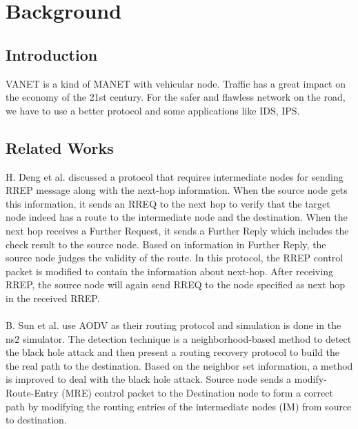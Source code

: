 
\chapter{Background} %

\label{Chapter2} %


\section{Introduction}
VANET is a kind of MANET with vehicular node.
Traffic has a great impact on the economy of the 21st century. For the safer and flawless network on the road, we have to use a better protocol and some applications like IDS, IPS.

\section{Related Works}
H. Deng et al.\cite{qa:1} discussed a protocol that requires intermediate nodes for sending RREP message along with the next-hop information. When the source node gets this information,
it sends an RREQ to the next hop to verify that the target node indeed has a route to the intermediate node and the destination. When
the next hop receives a Further Request, it sends a Further
Reply which includes the check result to the source node.
Based on information in Further Reply, the source node judges
the validity of the route. In this protocol, the RREP control
packet is modified to contain the information about next-hop.
After receiving RREP, the source node will again send RREQ
to the node specified as next hop in the received RREP.\\\\

B. Sun et al. \cite{qa:2} use AODV as their routing protocol and
simulation is done in the ns2 simulator. The detection technique
is a neighborhood-based method to detect the black hole
attack and then present a routing recovery protocol to build the
the real path to the destination. Based on the neighbor set
information, a method is improved to deal with the black hole
attack. Source node
sends a modify-Route-Entry (MRE) control packet to the
Destination node to form a correct path by modifying the
routing entries of the intermediate nodes (IM) from source to
destination.\\\\

